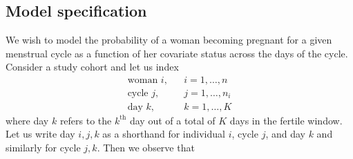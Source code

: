 \documentclass[11pt]{article}
\begin{document}
\subsection{Model specification}
We wish to model the probability of a woman becoming pregnant for a given menstrual cycle as a function of her covariate status across the days of the cycle.  Consider a study cohort and let us index
\[ \begin{array}{lll}
\text{woman } i, & & i = 1,\dots,n   \\[1ex]
\text{cycle } j, & & j = 1,\dots,n_i \\[1ex]
\text{day }   k, & & k = 1,\dots,K
\end{array} \]
where day $k$ refers to the $k^\text{th}$ day out of a total of $K$ days in the fertile window.  Let us write day $i,j,k$ as a shorthand for individual $i$, cycle $j$, and day $k$ and similarly for cycle $j,k$.  Then we observe that
\end{document}
